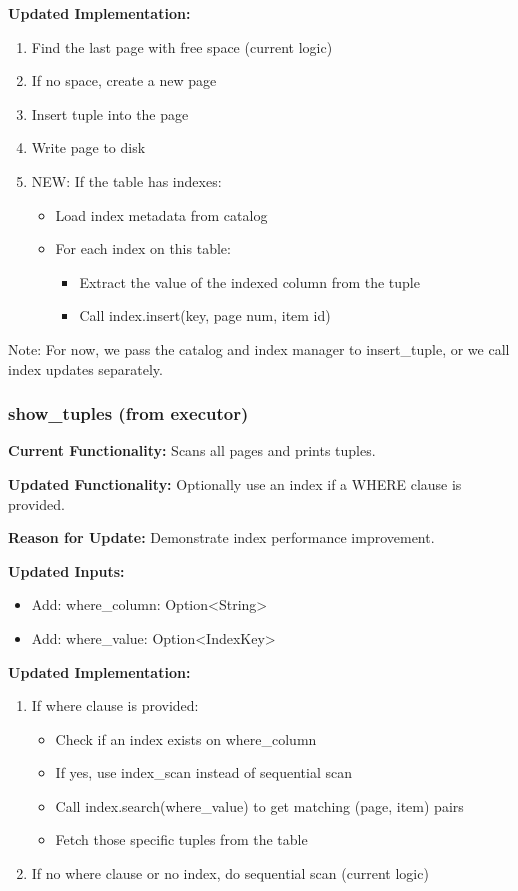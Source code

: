 \documentclass[11pt,a4paper]{article}
\begin{document}
\textbf{Updated Implementation:}
\begin{enumerate}
\item Find the last page with free space (current logic)
\item If no space, create a new page
\item Insert tuple into the page
\item Write page to disk
\item NEW: If the table has indexes:
    \begin{itemize}
    \item Load index metadata from catalog
    \item For each index on this table:
        \begin{itemize}
        \item Extract the value of the indexed column from the tuple
        \item Call index.insert(key, page num, item id)
        \end{itemize}
    \end{itemize}
\end{enumerate}

Note: For now, we pass the catalog and index manager to insert\_tuple, or we call index updates separately.

\subsubsection{show\_tuples (from executor)}

\textbf{Current Functionality:} Scans all pages and prints tuples.

\textbf{Updated Functionality:} Optionally use an index if a WHERE clause is provided.

\textbf{Reason for Update:} Demonstrate index performance improvement.

\textbf{Updated Inputs:}
\begin{itemize}
\item Add: where\_column: Option<String>
\item Add: where\_value: Option<IndexKey>
\end{itemize}

\textbf{Updated Implementation:}
\begin{enumerate}
\item If where clause is provided:
    \begin{itemize}
    \item Check if an index exists on where\_column
    \item If yes, use index\_scan instead of sequential scan
    \item Call index.search(where\_value) to get matching (page, item) pairs
    \item Fetch those specific tuples from the table
    \end{itemize}
\item If no where clause or no index, do sequential scan (current logic)
\end{enumerate}
\end{document}
